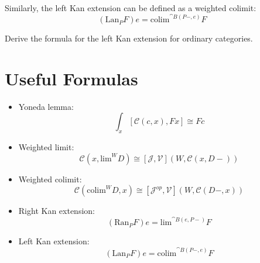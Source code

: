 \documentclass[DaoFP]{subfiles}
\begin{document}
Similarly, the left Kan extension can be defined as a weighted colimit:
\[ (\text{Lan}_P F) e = \text{colim}^{\cat B(P-, e)} F \]

\begin{exercise}
Derive the formula for the left Kan extension for ordinary categories.
\end{exercise}

\section{Useful Formulas}
\begin{itemize}
\item Yoneda lemma:
\[ \int_x [\mathcal C( c, x), F x] \cong F c \]
\item Weighted limit:
\[  \mathcal C(x, \text{lim}^W D) \cong [\mathcal J, \mathcal V] (W, \mathcal C(x, D-)) \]
\item Weighted colimit:
\[  \mathcal C(\text{colim}^W D, x) \cong [\mathcal J^{op}, \mathcal V] (W, \mathcal C(D-, x)) \]
\item Right Kan extension:
\[ (\text{Ran}_P F) e = \text{lim}^{\cat B(e, P-)} F  \]
\item Left Kan extension:
\[ (\text{Lan}_P F) e = \text{colim}^{\cat B(P-, e)} F \]
\end{itemize}
\end{document}
